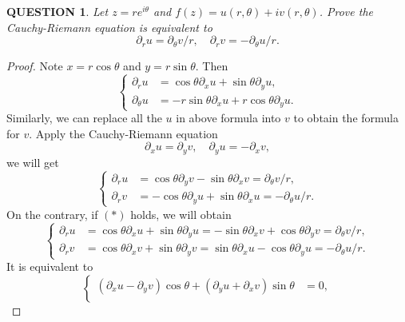 \documentclass[12pt]{article}
\renewcommand{\(}{\left(}%
\renewcommand{\)}{\right)}%
\renewcommand{\[}{\left[}%
\renewcommand{\]}{\right]}%
\newtheorem{question}{QUESTION}[section]}
\newtheorem{proof}{Proof.}}
\begin{document}
  \begin{question}
  	Let $z=re^{i\theta}$ and $f(z)=u(r,\theta)+iv(r,\theta)$. Prove the Cauchy-Riemann equation is equivalent to
  	\begin{equation*}
  		\partial_ru=\partial_\theta v/r,\quad \partial_rv=-\partial_\theta u/r.\tag{$*$}
  	\end{equation*}
  \end{question}
  \begin{proof}
 	Note $x=r\cos \theta$ and $y=r\sin \theta$. Then
 	\begin{equation*}
 		\left\{
 		\begin{split}
 			\partial_ru&=\cos\theta\partial_xu+\sin\theta\partial_yu,\\
 			\partial_\theta u&=-r\sin\theta\partial_xu+r\cos\theta\partial_yu.
 		\end{split}\right.
 	\end{equation*}
 	Similarly, we can replace all the $u$ in above formula into $v$ to obtain the formula for $v$. Apply the Cauchy-Riemann equation 
 	\begin{equation*}
 		\partial_xu=\partial_yv,\quad \partial_yu=-\partial_xv,
 	\end{equation*}
 	we will get
 	\begin{equation*}
 		\left\{
 		\begin{split}
 			\partial_ru&=\cos\theta\partial_yv-\sin\theta\partial_xv=\partial_\theta v/r,\\
 			\partial_rv&=-\cos\theta\partial_yu+\sin\theta\partial_xu=-\partial_\theta u/r.
 		\end{split}\right.
 	\end{equation*}
 	On the contrary, if $(*)$ holds, we will obtain
 	\begin{equation*}
 		\left\{
 		\begin{split}
 			\partial_ru&=\cos\theta\partial_xu+\sin\theta\partial_yu=-\sin\theta\partial_xv+\cos\theta\partial_yv=\partial_\theta v/r ,\\
 			\partial_rv&=\cos\theta\partial_xv+\sin\theta\partial_yv=\sin\theta\partial_xu-\cos\theta\partial_yu=-\partial_\theta u/r.
 		\end{split}\right.
 	\end{equation*}
 	It is equivalent to
 	\begin{equation*}
 		\left\{\begin{split}
 			(\partial_xu-\partial_yv)\cos\theta+(\partial_yu+\partial_xv)\sin\theta&=0,\\

\end{split}
\end{equation*}
\end{proof}
\end{document}
